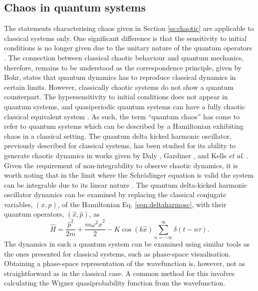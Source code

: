 \subsection{Chaos in quantum systems}
The statements characterising chaos given in Section \ref{ss:chaotic} are applicable to classical systems only. One significant difference is that the sensitivity to initial conditions is no longer given due to the unitary nature of the quantum operators \cite{CT:Schack_pre_1996,CT:Gardiner_pra_2000}. The connection between classical chaotic behaviour and quantum mechanics, therefore, remains to be understood as the correspondence principle, given by Bohr, states that quantum dynamics has to reproduce classical dynamics in certain limits. However, classically chaotic systems do not show a quantum counterpart. The hypersensitivity to initial conditions does not appear in quantum systems, and quasiperiodic quantum systems can have a fully chaotic classical equivalent system \cite{CT:Jensen_nat_1992}. As such, the term ``quantum chaos'' has come to refer to
quantum systems which can be described by a Hamiltonian exhibiting chaos in a classical setting. The quantum delta kicked harmonic oscillator, previously described for classical systems, has been studied for its ability to generate chaotic dynamics in works given by Daly \cite{THS:Daly_1994}, Gardiner \cite{THS:Gardiner_2000}, and Kells \textit{et al}. \cite{CT:Kells_pre_2004}. Given the requirement of non-integrability to observe chaotic dynamics, it is worth noting that in the limit where the Schr\"{o}dinger equation is valid the system can be integrable due to its linear nature \cite{THS:Gardiner_2000}. The quantum delta-kicked harmonic oscillator dynamics can be examined by replacing the classical conjugate variables, $(x,p)$, of the Hamiltonian Eq. \eqref{eqn:deltaharmosc}, with their quantum operators, $(\hat{x},\hat{p})$, as
\begin{equation}\label{eqn:hamiltonian_qkick}
\hat{H} = \frac{\hat{p}^2}{2m} + \frac{m\omega^2 \hat{x}^2}{2} - K\cos(k\hat{x})\displaystyle\sum_{n=-\infty}^{\infty}\delta(t-n\tau).
\end{equation}
The dynamics in such a quantum system can be examined using similar tools as the ones presented for classical systems, such as phase-space visualisation. Obtaining a phase-space representation of the wavefunction is, however, not as straightforward as in the classical case. A common method for this involves calculating the Wigner quasiprobability function from the wavefunction.

